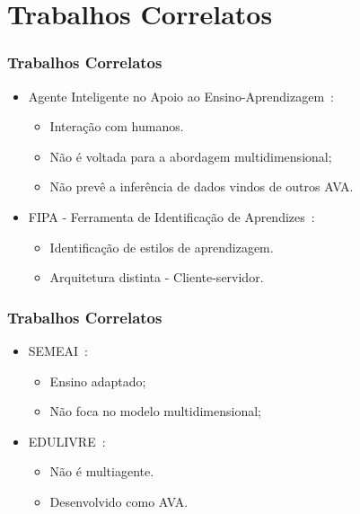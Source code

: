 \documentclass{beamer}
\begin{document}
\section{Trabalhos Correlatos}
\begin{frame}
    \frametitle{Trabalhos Correlatos}
    \begin{itemize}
        \item Agente Inteligente no Apoio ao Ensino-Aprendizagem~\cite{soaresagente}:
	\begin{itemize}
	        \item Interação com humanos.
	        \item Não é voltada para a abordagem multidimensional;
	        \item Não prevê a inferência de dados vindos de outros AVA.
	\end{itemize}
	\item FIPA - Ferramenta de Identificação de Aprendizes~\cite{bativa2011}:
	\begin{itemize}
	        \item Identificação de estilos de aprendizagem.
	        \item Arquitetura distinta - Cliente-servidor.
	\end{itemize}

    \end{itemize}
\end{frame}

\begin{frame}
    \frametitle{Trabalhos Correlatos}
    \begin{itemize}
        \item SEMEAI~\cite{geyer2001semeai}:
	\begin{itemize}
	        \item Ensino adaptado;
	        \item Não foca no modelo multidimensional;
	\end{itemize}
	\item EDULIVRE~\cite{rabelo2010identificacao}:
	\begin{itemize}
	        \item Não é multiagente.
	        \item Desenvolvido como AVA.
	\end{itemize}

    \end{itemize}
\end{frame}

\end{document}
